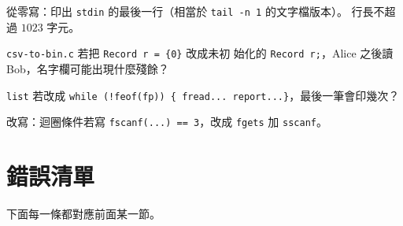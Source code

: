 

\begin{drills}[label=drills:fio-combine]
\item 從零寫：印出 \texttt{stdin} 的最後一行（相當於 \texttt{tail -n
1} 的文字檔版本）。 行長不超過 $1023$ 字元。
\item \texttt{csv-to-bin.c} 若把 \texttt{Record r = \{0\}} 改成未初
始化的 \texttt{Record r;}，Alice 之後讀 Bob，名字欄可能出現什麼殘餘？
\item \texttt{list} 若改成 \texttt{while (!feof(fp)) \{ fread...
report...\}}，最後一筆會印幾次？
\item 改寫：迴圈條件若寫 \texttt{fscanf(...) == 3}，改成
\texttt{fgets} 加 \texttt{sscanf}。
\end{drills}

\section{錯誤清單}
\label{sec:fio-checklist}

下面每一條都對應前面某一節。

